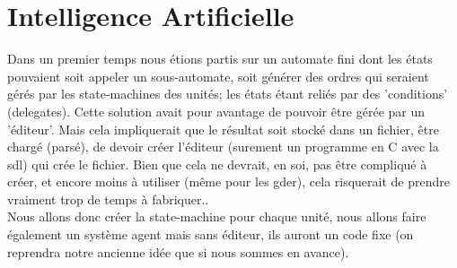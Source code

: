 \section{Intelligence Artificielle}


Dans un premier temps nous étions partis sur un automate fini dont les états pouvaient soit appeler un sous-automate, soit générer des ordres qui seraient gérés par les state-machines des unités; les états étant reliés par des 'conditions' (delegates).
Cette solution avait pour avantage de pouvoir être gérée par un 'éditeur'. Mais cela impliquerait que le résultat soit stocké dans un fichier, être chargé (parsé), de devoir créer l'éditeur (surement un programme en C avec la \ac{sdl}) qui crée le fichier. 
Bien que cela ne devrait, en soi, pas être compliqué à créer, et encore moins à utiliser (même pour les \ac{gder}), cela risquerait de prendre vraiment trop de temps à fabriquer.. \\

Nous allons donc créer la state-machine pour chaque unité, nous allons faire également un système agent mais sans éditeur, ils auront un code fixe (on reprendra notre ancienne idée que si nous sommes en avance).
